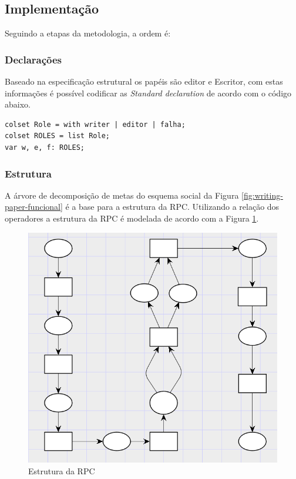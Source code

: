\subsection{Implementação}

Seguindo a etapas da metodologia, a ordem é:

\subsubsection{Declarações}

Baseado na especificação estrutural os papéis são editor e Escritor, com estas informações é possível codificar as \textit{Standard declaration} de acordo com o código abaixo.


\begin{lstlisting}
colset Role = with writer | editor | falha;
colset ROLES = list Role;
var w, e, f: ROLES;
\end{lstlisting}

\subsubsection{Estrutura}

A árvore de decomposição de metas do esquema social da Figura \ref{fig:writing-paper-funcional} é a base para a estrutura da RPC. Utilizando a relação dos operadores a estrutura da RPC é modelada de acordo com a Figura \ref{fig:5-estrutura1}.

\begin{figure}[ht]
\centering
\includegraphics[scale=0.7]{imagens/5-estruturaRPC1.png}
\caption{Estrutura da RPC}
\label{fig:5-estrutura1}
\end{figure}

